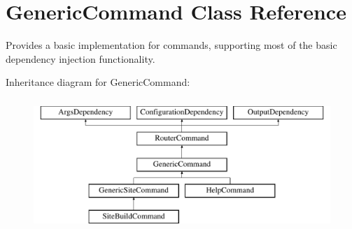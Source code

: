 \hypertarget{classGenericCommand}{\section{Generic\-Command Class Reference}
\label{classGenericCommand}
}


Provides a basic implementation for commands, supporting most of the basic dependency injection functionality.  


Inheritance diagram for Generic\-Command\-:\begin{figure}[H]
\begin{center}
\leavevmode
\includegraphics[height=5.000000cm]{classGenericCommand}
\end{center}
\end{figure}
